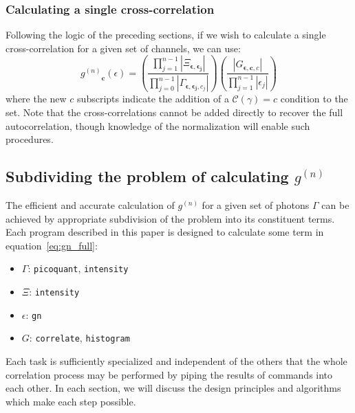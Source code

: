 \documentclass{article}
\newcommand{\parens}[1]{\ensuremath{\left( #1 \right)}}
\newcommand{\picoquant}{\texttt{picoquant}}
\newcommand{\intensity}{\texttt{intensity}}
\newcommand{\correlate}{\texttt{correlate}}
\newcommand{\histogram}{\texttt{histogram}}
\newcommand{\gn}[1]{\ensuremath{g^{(#1)}}}
\renewcommand{\vec}{\boldsymbol}
\newcommand{\abs}[1]{\ensuremath{\left|#1\right|}}
\newcommand{\channel}{\ensuremath{c}}
\newcommand{\Channel}{\ensuremath{\mathcal{C}}}
\newcommand{\photon}{\ensuremath{\gamma}}
\newcommand{\photons}{\ensuremath{\Gamma}}
\newcommand{\integrationtime}{\ensuremath{\Xi}}
\newcommand{\resolution}{\ensuremath{\epsilon}}
\newcommand{\GN}{\texttt{gn}}
\newcommand{\correlationset}{\ensuremath{G}}
\begin{document}
\subsubsection{Calculating a single cross-correlation}
Following the logic of the preceding sections, if we wish to calculate a single cross-correlation for a given set of channels, we can use:
\begin{equation}
\label{eq:cross_correlation_full}
\gn{n}_{\vec{\channel}}\parens{\resolution}  = 
       \parens{\frac{\prod_{j=1}^{n-1}
                           {\abs{\integrationtime_{
                                        \vec{\resolution},
                                        \vec{\resolution_{j}}}}}}
                    {\prod_{j=0}^{n-1}
                           {\abs{\photons_{
                                        \vec{\resolution},
                                        \vec{\resolution_{j}},
                                        \channel_{j}}}}}}
      \parens{\frac{\abs{\correlationset_{\vec{\resolution},
                                          \vec{\channel},
                                          \channel}}}
                   {\prod_{j=1}^{n-1}{\abs{\resolution_{j}}}}}
\end{equation}
where the new $\channel$  subscripts indicate the addition of a $\Channel(\photon)=c$ condition to the set. Note that the cross-correlations cannot be added directly to recover the full autocorrelation, though knowledge of the normalization will enable such procedures.

\subsection{Subdividing the problem of calculating \gn{n}}
The efficient and accurate calculation of \gn{n} for a given set of photons \photons{} can be achieved by appropriate subdivision of the problem into its constituent terms. Each program described in this paper is designed to calculate some term in equation~\ref{eq:gn_full}:
\begin{itemize}
\item $\photons$: \picoquant, \intensity
\item $\integrationtime$: \intensity
\item $\resolution$: \GN
\item $\correlationset$: \correlate, \histogram
\end{itemize}
Each task is sufficiently specialized and independent of the others that the whole correlation process may be performed by piping the results of commands into each other. In each section, we will discuss the design principles and algorithms which make each step possible.
\end{document}
